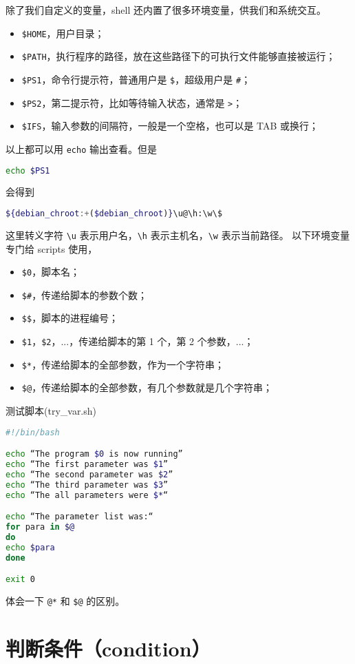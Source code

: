 \documentclass[a4paper]{ctexart}
\begin{document}
除了我们自定义的变量，shell 还内置了很多环境变量，供我们和系统交互。
\begin{itemize}
\item \verb|$HOME|，用户目录；
\item \verb|$PATH|，执行程序的路径，放在这些路径下的可执行文件能够直接被运行；
\item \verb|$PS1|，命令行提示符，普通用户是 \verb|$|，超级用户是 \verb|#|；
\item \verb|$PS2|，第二提示符，比如等待输入状态，通常是 \verb|>|；
\item \verb|$IFS|，输入参数的间隔符，一般是一个空格，也可以是 TAB 或换行；
\end{itemize}
以上都可以用 \verb|echo| 输出查看。但是
\begin{lstlisting}[language=sh]
echo $PS1
\end{lstlisting}
会得到
\begin{lstlisting}[language=sh]
${debian_chroot:+($debian_chroot)}\u@\h:\w\$
\end{lstlisting}
这里转义字符 \verb|\u| 表示用户名，\verb|\h| 表示主机名，\verb|\w| 表示当前路径。
以下环境变量专门给 scripts 使用，
\begin{itemize}
\item \verb|$0|，脚本名；
\item \verb|$#|，传递给脚本的参数个数；
\item \verb|$$|，脚本的进程编号；
\item \verb|$1|，\verb|$2|，...，传递给脚本的第 1 个，第 2 个参数，...；
\item \verb|$*|，传递给脚本的全部参数，作为一个字符串；
\item \verb|$@|，传递给脚本的全部参数，有几个参数就是几个字符串；
\end{itemize}
测试脚本(try\_var.sh)
\begin{lstlisting}[language=sh]
#!/bin/bash

echo “The program $0 is now running”
echo “The first parameter was $1”
echo “The second parameter was $2”
echo “The third parameter was $3”
echo “The all parameters were $*“

echo “The parameter list was:“
for para in $@
do
echo $para
done

exit 0
\end{lstlisting}
体会一下 \verb|@*| 和 \verb|$@| 的区别。

\section{判断条件（condition）}
\end{document}

